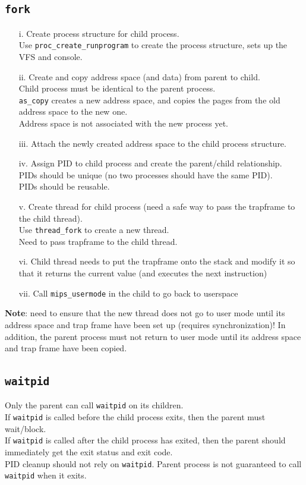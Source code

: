 \documentclass[12pt]{article}
\theoremstyle{plain}
\theoremstyle{definition}
\begin{document}
\subsection{\texttt{fork}}
\begin{enumerate}
  \item[i.] Create process structure for child process. \\
  Use \texttt{proc\_create\_runprogram} to create the process structure, sets up the VFS and console.
  \item[ii.] Create and copy address space (and data) from parent to child. \\
  Child process must be identical to the parent process. \\
  \texttt{as\_copy} creates a new address space, and copies the pages from the old address space to the new one. \\
  Address space is not associated with the new process yet.
  \item[iii.] Attach the newly created address space to the child process structure.
  \item[iv.] Assign PID to child process and create the parent/child relationship. \\
  PIDs should be unique (no two processes should have the same PID). \\
  PIDs should be reusable.
  \item[v.] Create thread for child process (need a safe way to pass the trapframe to the child thread). \\
  Use \texttt{thread\_fork} to create a new thread. \\
  Need to pass trapframe to the child thread.
  \item[vi.] Child thread needs to put the trapframe onto the stack and modify it so that it returns the current value (and executes the next instruction)
  \item[vii.] Call \texttt{mips\_usermode} in the child to go back to userspace
\end{enumerate}

\textbf{Note}: need to ensure that the new thread does not go to user mode until its address space and trap frame have been set up (requires synchronization)!
In addition, the parent process must not return to user mode until its address space and trap frame have been copied.

\subsection{\texttt{waitpid}}
Only the parent can call \texttt{waitpid} on its children. \\
If \texttt{waitpid} is called before the child process exits, then the parent must wait/block. \\
If \texttt{waitpid} is called after the child process has exited, then the parent should immediately get the exit status and exit code. \\
PID cleanup should not rely on \texttt{waitpid}.
Parent process is not guaranteed to call \texttt{waitpid} when it exits.
\end{document}
